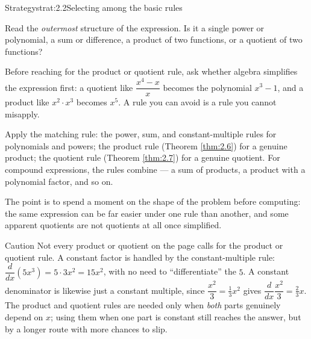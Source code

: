 \documentclass[a4paper,12pt,oneside]{memoir}
\begin{document}
\begin{envstrategy}{Strategy}{strat:2.2}{Selecting among the basic rules}
\begin{steps}
  \item Read the \emph{outermost} structure of the expression. Is it a single power or polynomial, a sum or difference, a product of two functions, or a quotient of two functions?
  \item Before reaching for the product or quotient rule, ask whether algebra simplifies the expression first: a quotient like \(\dfrac{x^{4} - x}{x}\) becomes the polynomial \(x^{3} - 1\), and a product like \(x^{2}\cdot x^{3}\) becomes \(x^{5}\). A rule you can avoid is a rule you cannot misapply.
  \item Apply the matching rule: the power, sum, and constant-multiple rules for polynomials and powers; the product rule (Theorem \ref{thm:2.6}) for a genuine product; the quotient rule (Theorem \ref{thm:2.7}) for a genuine quotient. For compound expressions, the rules combine — a sum of products, a product with a polynomial factor, and so on.
\end{steps}
The point is to spend a moment on the shape of the problem before computing: the same expression can be far easier under one rule than another, and some apparent quotients are not quotients at all once simplified.
\end{envstrategy}
\begin{envcaution}{Caution}{}{}
Not every product or quotient on the page calls for the product or quotient rule. A constant factor is handled by the constant-multiple rule: \(\dfrac{d}{dx}(5x^{3}) = 5 \cdot 3x^{2} = 15x^{2}\), with no need to “differentiate” the \(5\). A constant denominator is likewise just a constant multiple, since \(\dfrac{x^{2}}{3} = \tfrac{1}{3}x^{2}\) gives \(\dfrac{d}{dx}\dfrac{x^{2}}{3} = \tfrac{2}{3}x\). The product and quotient rules are needed only when \emph{both} parts genuinely depend on \(x\); using them when one part is constant still reaches the answer, but by a longer route with more chances to slip.
\end{envcaution}
\end{document}
